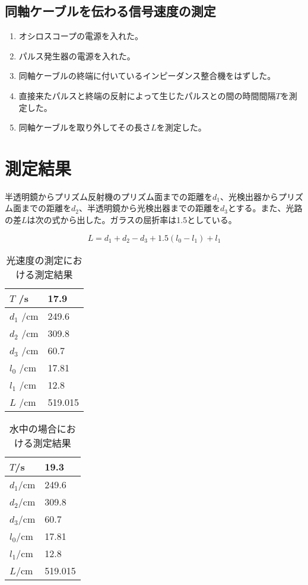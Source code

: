 \documentclass{jsarticle}
\begin{document}
\subsection{同軸ケーブルを伝わる信号速度の測定}
\begin{enumerate}
    \item オシロスコープの電源を入れた。
    \item パルス発生器の電源を入れた。
    \item 同軸ケーブルの終端に付いているインピーダンス整合機をはずした。
    \item 直接来たパルスと終端の反射によって生じたパルスとの間の時間間隔$T$を測定した。
    \item 同軸ケーブルを取り外してその長さ$L$を測定した。
\end{enumerate}

\section{測定結果}

半透明鏡からプリズム反射機のプリズム面までの距離を$d_1$、光検出器からプリズム面までの距離を$d_2$、半透明鏡から光検出器までの距離を$d_3$とする。また、光路の差$L$は次の式から出した。ガラスの屈折率は1.5としている。

\begin{equation}
    L = d_1 + d_2 - d_3 + 1.5(l_0 - l_1) + l_1
\end{equation}

\begin{table}[H]
\centering
\caption{光速度の測定における測定結果}
\label{one}
\begin{tabular}{|l|l|}
\hline
$T $ /s & 17.9    \\ \hline
$d_1$ /cm & 249.6   \\ \hline
$d_2$ /cm & 309.8   \\ \hline
$d_3$ /cm & 60.7    \\ \hline
$l_0$ /cm & 17.81   \\ \hline
$l_1$ /cm & 12.8    \\ \hline
$L $ /cm & 519.015 \\ \hline
\end{tabular}
\end{table}

\begin{table}[H]
\centering
\caption{水中の場合における測定結果}
\label{two}
\begin{tabular}{|l|l|}
\hline
$T   $/s & 19.3    \\ \hline
$d_1$/cm & 249.6   \\ \hline
$d_2$/cm & 309.8   \\ \hline
$d_3$/cm & 60.7    \\ \hline
$l_0$/cm & 17.81   \\ \hline
$l_1$/cm & 12.8    \\ \hline
$L   $/cm & 519.015 \\ \hline
\end{tabular}
\end{table}
\end{document}
